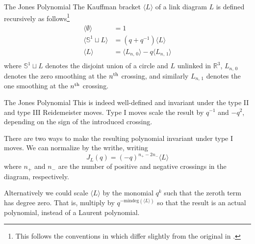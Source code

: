\documentclass{beamer}
\begin{document}
    \begin{frame}{The Jones Polynomial}
        The Kauffman bracket $\langle{L}\rangle$ of a link diagram $L$ is
        defined recursively as follows\footnote{%
            This follows the conventions in \cite{BarNatanKhovanovJones}
            which differ slightly from the original in
            \cite{KauffmanStateModels}.
        }
        \begin{align}
            \langle{\emptyset}\rangle&=1\\
            \langle{\mathbb{S}^{1}\sqcup{L}}\rangle
            &=(q+q^{-1})\langle{L}\rangle\\
            \langle{L}\rangle
            &=\langle{L_{n,\,0}}\rangle-q\langle{L_{n,\,1}}\rangle\\
        \end{align}
        where $\mathbb{S}^{1}\sqcup{L}$ denotes the disjoint union of a
        circle and $L$ unlinked in $\mathbb{R}^{3}$, $L_{n,\,0}$ denotes the
        zero smoothing at the $n^{\small\textrm{th}}$ crossing, and
        similarly $L_{n,\,1}$ denotes the one smoothing at the
        $n^{\small\textrm{th}}$ crossing.
    \end{frame}
    \begin{frame}{The Jones Polynomial}
        This is indeed well-defined and invariant
        under the type II and type III Reidemeister moves. Type I moves scale
        the result by $q^{-1}$ and $-q^{2}$, depending on the sign of the
        introduced crossing.
        \par\hfill\par
        There are two ways to make the resulting polynomial invariant under
        type I moves. We can normalize by the writhe, writing
        \begin{equation}
            J_{L}(q)=(-q)^{n_{+}-2n_{-}}\langle{L}\rangle
        \end{equation}
        where $n_{+}$ and $n_{-}$ are the number of positive and negative
        crossings in the diagram, respectively.
        \par\hfill\par
        Alternatively we could scale $\langle{L}\rangle$ by the monomial
        $q^{k}$ such that the zeroth term has degree zero. That is, multiply
        by $q^{-\textrm{mindeg}(\langle{L}\rangle)}$ so that the result is an
        actual polynomial, instead of a Laurent polynomial.
    \end{frame}
\end{document}
